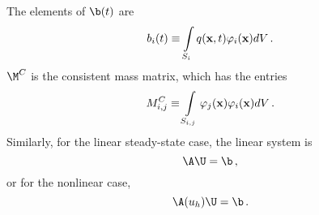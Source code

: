 The elements of $\b(t)$ are
\begin{equation}
	b_i(t) \equiv \int\limits_{S_i} q(\mathbf{x},t)\varphi_i(\mathbf{x}) dV \,.
\end{equation}
$\M^C$ is the consistent mass matrix, which has the entries
\begin{equation}\label{massmatrix}
	M^C_{i,j} \equiv \int\limits_{S_{i,j}}
   \varphi_j(\mathbf{x})\varphi_i(\mathbf{x}) dV \,.
\end{equation}
Similarly, for the linear steady-state case, the linear system is
\begin{equation}
  \A\U = \b \eqc
\end{equation}
or for the nonlinear case,
\begin{equation}
  \A(u_h)\U = \b \eqp
\end{equation}
